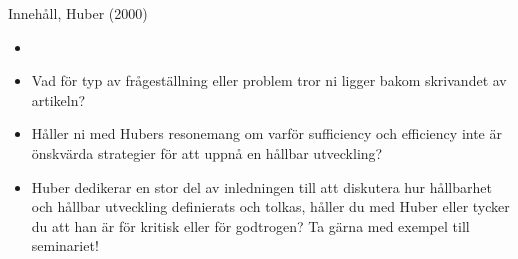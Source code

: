 \documentclass[12pt,a4paper]{article}
\begin{document}
Innehåll, Huber (2000)
\begin{itemize}
\item \item Vad för typ av frågeställning eller problem tror ni ligger bakom skrivandet av artikeln?
\item Håller ni med Hubers resonemang om varför sufficiency och efficiency inte är önskvärda strategier för
att uppnå en hållbar utveckling?
\item Huber dedikerar en stor del av inledningen till att diskutera hur hållbarhet och hållbar utveckling
definierats och tolkas, håller du med Huber eller tycker du att han är för kritisk eller för godtrogen?
Ta gärna med exempel till seminariet!
\end{itemize}
\end{document}
